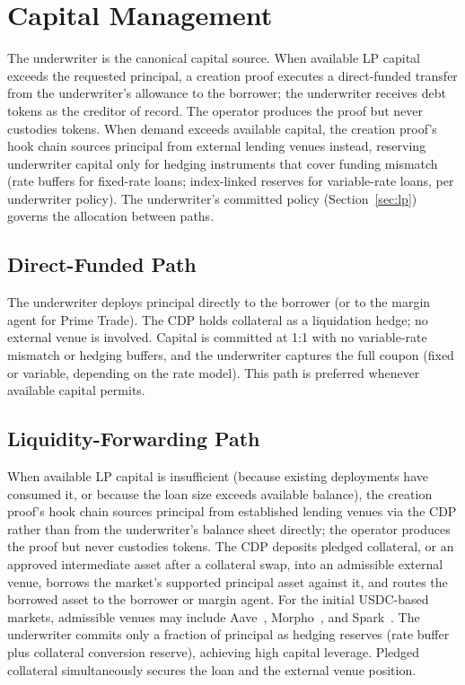 \section{Capital Management}
\label{sec:capital}

The underwriter is the canonical capital source. When available LP capital exceeds the requested principal, a creation proof executes a direct-funded transfer from the underwriter's allowance to the borrower; the underwriter receives debt tokens as the creditor of record. The operator produces the proof but never custodies tokens. When demand exceeds available capital, the creation proof's hook chain sources principal from external lending venues instead, reserving underwriter capital only for hedging instruments that cover funding mismatch (rate buffers for fixed-rate loans; index-linked reserves for variable-rate loans, per underwriter policy). The underwriter's committed policy (Section~\ref{sec:lp}) governs the allocation between paths.

\subsection{Direct-Funded Path}

The underwriter deploys principal directly to the borrower (or to the margin agent for Prime Trade). The CDP holds collateral as a liquidation hedge; no external venue is involved. Capital is committed at 1:1 with no variable-rate mismatch or hedging buffers, and the underwriter captures the full coupon (fixed or variable, depending on the rate model). This path is preferred whenever available capital permits.

\subsection{Liquidity-Forwarding Path}

When available LP capital is insufficient (because existing deployments have consumed it, or because the loan size exceeds available balance), the creation proof's hook chain sources principal from established lending venues via the CDP rather than from the underwriter's balance sheet directly; the operator produces the proof but never custodies tokens. The CDP deposits pledged collateral, or an approved intermediate asset after a collateral swap, into an admissible external venue, borrows the market's supported principal asset against it, and routes the borrowed asset to the borrower or margin agent. For the initial USDC-based markets, admissible venues may include Aave~\cite{aave2026}, Morpho~\cite{morphoblue2023}, and Spark~\cite{spark2023}. The underwriter commits only a fraction of principal as hedging reserves (rate buffer plus collateral conversion reserve), achieving high capital leverage. Pledged collateral simultaneously secures the \daloc{} loan and the external venue position.

